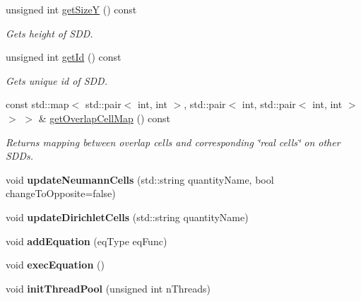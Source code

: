 \begin{DoxyCompactItemize}
unsigned int \hyperlink{classSDDistributed_ab021a9aea5d9201a179e1cbec1b5c4fb}{getSizeY} () const 
\begin{DoxyCompactList}\small\item\em Gets height of SDD. \item\end{DoxyCompactList}\item 
unsigned int \hyperlink{classSDDistributed_ae8172d73b8eedd0fe13712ef898149a2}{getId} () const 
\begin{DoxyCompactList}\small\item\em Gets unique id of SDD. \item\end{DoxyCompactList}\item 
const std::map$<$ std::pair$<$ int, int $>$, std::pair$<$ int, std::pair$<$ int, int $>$ $>$ $>$ \& \hyperlink{classSDDistributed_afe481d91ab9ba6ebde03e4e61a6cd053}{getOverlapCellMap} () const 
\begin{DoxyCompactList}\small\item\em Returns mapping between overlap cells and corresponding \char`\"{}real cells\char`\"{} on other SDDs. \item\end{DoxyCompactList}\item 
\hypertarget{classSDDistributed_a492c6799b5b1f79481a2ee6e50979a18}{
void {\bfseries updateNeumannCells} (std::string quantityName, bool changeToOpposite=false)}
\label{classSDDistributed_a492c6799b5b1f79481a2ee6e50979a18}

\item 
\hypertarget{classSDDistributed_a0eaa89db3fd4b663d887de8dcf9f65af}{
void {\bfseries updateDirichletCells} (std::string quantityName)}
\label{classSDDistributed_a0eaa89db3fd4b663d887de8dcf9f65af}

\item 
\hypertarget{classSDDistributed_a4c8dc37fa1d0991f0b883563df329518}{
void {\bfseries addEquation} (eqType eqFunc)}
\label{classSDDistributed_a4c8dc37fa1d0991f0b883563df329518}

\item 
\hypertarget{classSDDistributed_a083335cd910b0818fb0990873b4e1f87}{
void {\bfseries execEquation} ()}
\label{classSDDistributed_a083335cd910b0818fb0990873b4e1f87}

\item 
\hypertarget{classSDDistributed_a75660cf18d7248ac64e86ab457061b91}{
void {\bfseries initThreadPool} (unsigned int nThreads)}
\label{classSDDistributed_a75660cf18d7248ac64e86ab457061b91}

\end{DoxyCompactItemize}


